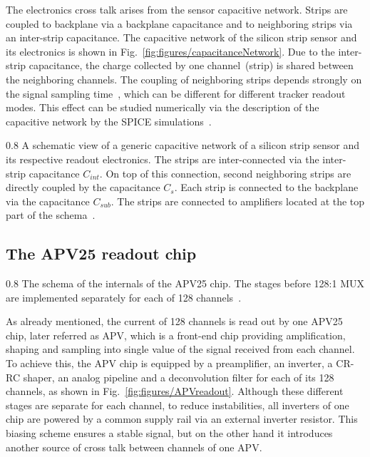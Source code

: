The electronics cross talk arises from the sensor capacitive network. Strips are coupled to backplane via a backplane capacitance and to neighboring strips via an inter-strip capacitance. The capacitive network of the silicon strip sensor and its electronics is shown in Fig.~\ref{fig:figures/capacitanceNetwork}. Due to the inter-strip capacitance, the charge collected by one channel~(strip) is shared between the neighboring channels. The coupling of neighboring strips depends strongly on the signal sampling time~\cite{Bloch:2007zza}, which can be different for different tracker readout modes. This effect can be studied numerically via the description of the capacitive network by the SPICE simulations~\cite{Barberis:1993ph}.


                 {0.8}       %
                 {A schematic view of a generic capacitive network of a silicon strip sensor and its respective readout electronics. The strips are inter-connected via the inter-strip capacitance $C_{int}$. On top of this connection, second neighboring strips are directly coupled by the capacitance $C_{s}$. Each strip is connected to the backplane via the capacitance $C_{sub}$. The strips are connected to amplifiers located at the top part of the schema~\cite{Lutz:1987wd}.}




\subsection{The APV25 readout chip \label{sec:APV}}


                 {0.8}       %
                 {The schema of the internals of the APV25 chip. The stages before 128:1 MUX are implemented separately for each of 128 channels~\cite{Friedl:2001kra}. } %

As already mentioned, the current of 128 channels is read out by one APV25~\cite{French:2001xb} chip, later referred as APV, which is a front-end chip providing amplification, shaping and sampling into single value of the signal received from each channel. To achieve this, the APV chip is equipped by a preamplifier, an inverter, a CR-RC shaper, an analog pipeline and a deconvolution filter for each of its 128 channels, as shown in Fig.~\ref{fig:figures/APVreadout}. Although these different stages are separate for each channel, to reduce instabilities, all inverters of one chip are powered by a common supply rail via an external inverter resistor. This biasing scheme ensures a stable signal, but on the other hand it introduces another source of cross talk between channels of one APV.

